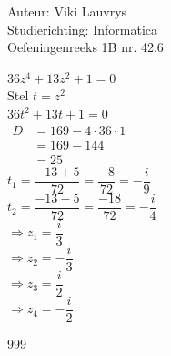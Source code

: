 \documentclass[a4paper]{article}
\begin{document}
  
\noindent \large Auteur: Viki Lauvrys        \\
\noindent \large Studierichting: Informatica \\
\noindent \large Oefeningenreeks 1B nr. 42.6 \\

\medskip

\normalsize

$ 36z^4 + 13z^2 + 1 = 0 $ \\

Stel $ t = z^2 $ \\

$ 36t^2 + 13t + 1 = 0 $ \\

$ \begin{array}{lll}
	D & = 169 - 4 \cdot 36 \cdot 1 \\
	& = 169 - 144 \\
	& = 25
\end{array} $ \\

$ t_1 = \dfrac{-13 + 5}{72} = \dfrac{-8}{72} = -\dfrac{i}{9} $ \\

$ t_2 = \dfrac{-13 - 5}{72} = \dfrac{-18}{72} = -\dfrac{i}{4} $ \\

$ \Rightarrow z_1 = \dfrac{i}{3} $ \\

$ \Rightarrow z_2 = -\dfrac{i}{3} $ \\

$ \Rightarrow z_3 = \dfrac{i}{2} $ \\

$ \Rightarrow z_4 = -\dfrac{i}{2} $ \\

\begin{thebibliography}{999}
\end{thebibliography}
\end{document}
